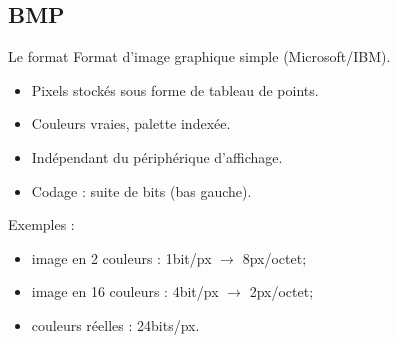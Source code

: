 \documentclass[14pt]{beamer}
\begin{document}
\subsection{BMP}
\begin{frame}{Le format \subsecname}
Format d'image graphique simple (Microsoft/IBM).
\begin{itemize}
\item Pixels stockés sous forme de tableau de points.
\item Couleurs vraies, palette indexée.
\item Indépendant du périphérique d'affichage.
\item Codage : suite de bits (bas gauche).
\end{itemize}
\vfill
Exemples :
\begin{itemize}
\item image en 2 couleurs : 1bit/px $\rightarrow$ 8px/octet;
\item image en 16 couleurs : 4bit/px $\rightarrow$ 2px/octet;
\item couleurs réelles : 24bits/px.
\end{itemize}




\end{frame}


\end{document}
